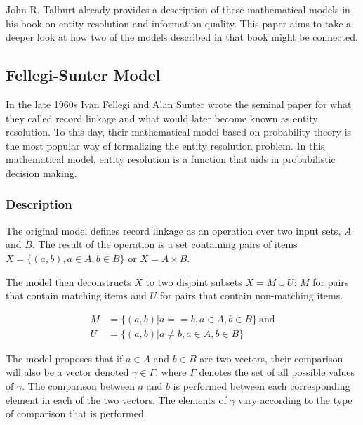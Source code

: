 \documentclass[lettersize,journal]{IEEEtran}
\begin{document}
    John R. Talburt already provides a description of these mathematical models
    in his book on entity resolution and information quality\cite{Tal11}.
    This paper aims to take a deeper look at how two of the models described in
    that book might be connected.

    \subsection[fsm]{Fellegi-Sunter Model}\label{subsec:fsm}

    In the late 1960s Ivan Fellegi and Alan Sunter wrote the seminal
    paper\cite{fs1969} for what they called record linkage and what would later
    become known as entity resolution.
    To this day, their mathematical model based on probability theory is the
    most popular way of formalizing the entity resolution problem.
    In this mathematical model, entity resolution is a function that aids in 
    probabilistic decision making.
    
    \subsubsection[fsm-desc]{Description}\label{subsec:fsm-desc}

    The original model defines record linkage as an operation over two input
    sets, $A$ and $B$.
    The result of the operation is a set containing pairs of items
    $X = \{(a, b), a \in A, b \in B\}$ or $X = A \times B$.
    
    The model then deconstructs $X$ to two disjoint subsets $X = M \cup U$: $M$ for pairs that
    contain matching items and $U$ for pairs that contain non-matching items.

    \begin{align}
        M &= \{(a, b) | a == b, a \in A, b \in B\}~\textrm{and} \\
        U &= \{(a, b) | a \neq b, a \in A, b \in B\}
    \end{align}

    The model proposes that if $a \in A$ and $b \in B$ are two vectors, their
    comparison will also be a vector denoted $\gamma \in \varGamma$, where
    $\varGamma$ denotes the set of all possible values of $\gamma$.
    The comparison between $a$ and $b$ is performed between each corresponding
    element in each of the two vectors.
    The elements of $\gamma$ vary according to the type of comparison that is
    performed\cite{winkler1990}.
\end{document}
